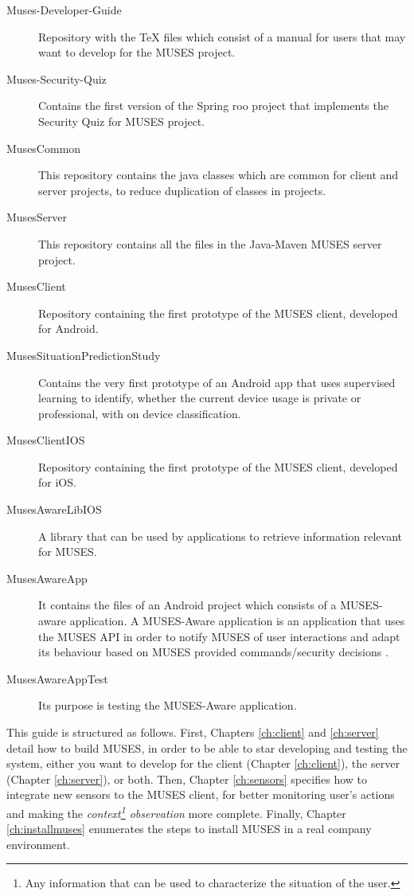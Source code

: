 \documentclass[a4paper,11pt]{book}
\begin{document}
\begin{description}
  \item[Muses-Developer-Guide] Repository with the TeX files which consist of a manual for users that may want to develop for the MUSES project.
  \item[Muses-Security-Quiz] Contains the first version of the Spring roo project that implements the Security Quiz for MUSES project.
  \item[MusesCommon] This repository contains the java classes which are common for client and server projects, to reduce duplication of classes in projects.
  \item[MusesServer] This repository contains all the files in the Java-Maven MUSES server project.
  \item[MusesClient] Repository containing the first prototype of the MUSES client, developed for Android.
  \item[MusesSituationPredictionStudy] Contains the very first prototype of an Android app that uses supervised learning to identify, whether the current device usage is private or professional, with on device classification.
  \item[MusesClientIOS] Repository containing the first prototype of the MUSES client, developed for iOS.
  \item[MusesAwareLibIOS] A library that can be used by applications to retrieve information relevant for MUSES.
  \item[MusesAwareApp] It contains the files of an Android project which consists of a MUSES-aware application. A MUSES-Aware application is an application that uses the MUSES API in order to notify MUSES of user interactions and adapt its behaviour based on MUSES provided commands/security decisions \cite{deliverable24}.
  \item[MusesAwareAppTest] Its purpose is testing the MUSES-Aware application.
\end{description}

This guide is structured as follows. First, Chapters \ref{ch:client} and \ref{ch:server} detail how to build MUSES, in order to be able to star developing and testing the system, either you want to develop for the client (Chapter \ref{ch:client}), the server (Chapter \ref{ch:server}), or both. Then, Chapter \ref{ch:sensors} specifies how to integrate new sensors to the MUSES client, for better monitoring user's actions and making the \textit{context\footnote{Any information that can be used to characterize the situation of the user.\cite{deliverable61}} observation} more complete. Finally, Chapter \ref{ch:installmuses} enumerates the steps to install MUSES in a real company environment.
\end{document}
